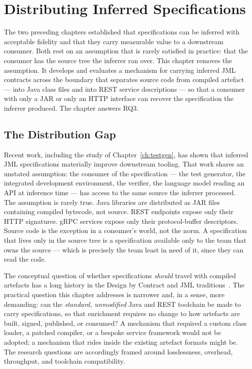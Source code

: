 \chapter{Distributing Inferred Specifications}
\label{ch:distribution}

The two preceding chapters established that specifications can be inferred with
acceptable fidelity and that they carry measurable value to a downstream
consumer. Both rest on an assumption that is rarely satisfied in practice: that
the consumer has the source tree the inferrer ran over. This chapter removes
the assumption. It develops and evaluates a mechanism for carrying inferred JML
contracts across the boundary that separates source code from compiled artefact
--- into Java class files and into REST service descriptions --- so that a
consumer with only a JAR or only an HTTP interface can recover the
specification the inferrer produced. The chapter answers RQ3.

\section{The Distribution Gap}
\label{sec:dist-gap}

Recent work, including the study of Chapter~\ref{ch:testgen}, has shown that
inferred JML specifications materially improve downstream tooling. That work
shares an unstated assumption: the consumer of the specification --- the test
generator, the integrated development environment, the verifier, the language
model reading an API at inference time --- has access to the same source the
inferrer processed. The assumption is rarely true. Java libraries are
distributed as JAR files containing compiled bytecode, not source. REST
endpoints expose only their HTTP signatures. gRPC services expose only their
protocol-buffer descriptors. Source code is the exception in a consumer's world,
not the norm. A specification that lives only in the source tree is a
specification available only to the team that owns the source --- which is
precisely the team least in need of it, since they can read the code.

The conceptual question of whether specifications \emph{should} travel with
compiled artefacts has a long history in the Design by Contract and JML
traditions~\cite{meyer1992design, leavens2006design, jml}. The practical
question this chapter addresses is narrower and, in a sense, more demanding:
can the \emph{standard, unmodified} Java and REST toolchain be made to carry
specifications, so that enrichment requires no change to how artefacts are
built, signed, published, or consumed? A mechanism that required a custom
class loader, a patched compiler, or a bespoke service framework would not be
adopted; a mechanism that rides inside the existing artefact formats might be.
The research questions are accordingly framed around losslessness, overhead,
throughput, and toolchain compatibility.

